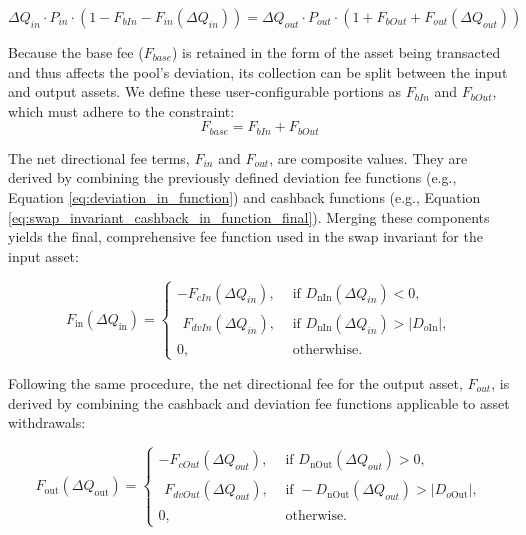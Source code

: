 \begin{equation}
	\label{eq:swap_invariant}
	\Delta Q_{in} \cdot P_{in} \cdot (1 - F_{bIn} - F_{in}(\Delta Q_{in})) = \Delta Q_{out} \cdot P_{out} \cdot (1 + F_{bOut} + F_{out}(\Delta Q_{out}))
\end{equation}

Because the base fee ($F_{base}$) is retained in the form of the asset being transacted and thus affects the pool's deviation, its collection can be split between the input and output assets. We define these user-configurable portions as $F_{bIn}$ and $F_{bOut}$, which must adhere to the constraint:
\begin{equation}
	F_{base} = F_{bIn} + F_{bOut}
\end{equation}

The net directional fee terms, $F_{in}$ and $F_{out}$, are composite values. They are derived by combining the previously defined deviation fee functions (e.g., Equation \ref{eq:deviation_in_function}) and cashback functions (e.g., Equation \ref{eq:swap_invariant_cashback_in_function_final}). Merging these components yields the final, comprehensive fee function used in the swap invariant for the input asset:

\begin{equation}
	\label{eq:fee_in_formula}
	F_{\mathrm{in}}(\Delta Q_{\mathrm{in}})
	=
	\begin{cases}
		-F_{cIn}(\Delta Q_{in}),
		& \text{if } D_{\mathrm{nIn}}(\Delta Q_{in}) < 0,
		\\[2ex]

		\displaystyle
		\begin{aligned}
			F_{dvIn}(\Delta Q_{in}),
		\end{aligned}
		& \text{if } D_{\mathrm{nIn}}(\Delta Q_{in})
		> \lvert D_{o\mathrm{In}}\rvert,
		\\[2ex]
		0,
		& \text{otherwhise.}
	\end{cases}
\end{equation}


Following the same procedure, the net directional fee for the output asset, $F_{out}$, is derived by combining the cashback and deviation fee functions applicable to asset withdrawals:

\begin{equation}
	\label{eq:fee_out_formula}
	F_{\mathrm{out}}(\Delta Q_{\mathrm{out}})
	=
	\begin{cases}
		-F_{cOut}(\Delta Q_{out}),
		& \text{if } D_{\mathrm{nOut}}(\Delta Q_{out}) > 0,
		\\[2ex]
		\displaystyle
		\begin{aligned}
			F_{dvOut}(\Delta Q_{out}),
		\end{aligned}
		& \text{if } -D_{\mathrm{nOut}}(\Delta Q_{out})
		> \lvert D_{o\mathrm{Out}}\rvert,
		\\[2ex]
		0,
		& \text{otherwise.}
	\end{cases}
\end{equation}

